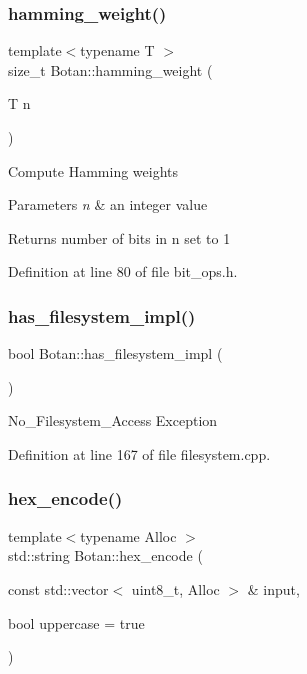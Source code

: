 \subsubsection{\texorpdfstring{hamming\+\_\+weight()}{hamming\_weight()}}
{\footnotesize\ttfamily template$<$typename T $>$ \\
size\+\_\+t Botan\+::hamming\+\_\+weight (\begin{DoxyParamCaption}\item[{T}]{n }\end{DoxyParamCaption})\hspace{0.3cm}{\ttfamily [inline]}}

Compute Hamming weights 
\begin{DoxyParams}{Parameters}
{\em n} & an integer value \\
\hline
\end{DoxyParams}
\begin{DoxyReturn}{Returns}
number of bits in n set to 1 
\end{DoxyReturn}


Definition at line 80 of file bit\+\_\+ops.\+h.

\mbox{\label{namespace_botan_acc6c58c9b9ef1e9aa417eb2e71371828}} 
\subsubsection{\texorpdfstring{has\+\_\+filesystem\+\_\+impl()}{has\_filesystem\_impl()}}
{\footnotesize\ttfamily bool Botan\+::has\+\_\+filesystem\+\_\+impl (\begin{DoxyParamCaption}{ }\end{DoxyParamCaption})}

No\+\_\+\+Filesystem\+\_\+\+Access Exception 

Definition at line 167 of file filesystem.\+cpp.

\mbox{\label{namespace_botan_a02a63d270351924b382780ee6d5b80c3}} 
\subsubsection{\texorpdfstring{hex\+\_\+encode()}{hex\_encode()}}
{\footnotesize\ttfamily template$<$typename Alloc $>$ \\
std\+::string Botan\+::hex\+\_\+encode (\begin{DoxyParamCaption}\item[{const std\+::vector$<$ uint8\+\_\+t, Alloc $>$ \&}]{input,  }\item[{bool}]{uppercase = {\ttfamily true} }\end{DoxyParamCaption})}

